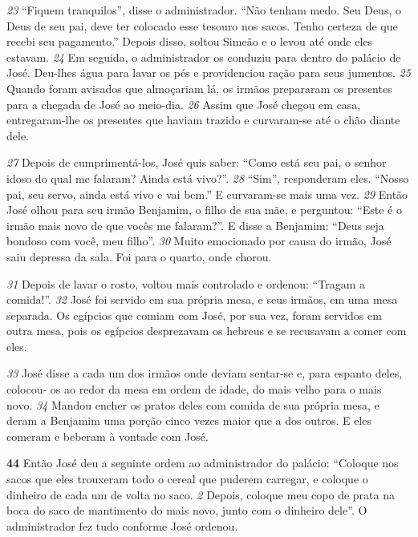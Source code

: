 \bigskip
\textit{\tiny 23}
“Fiquem tranquilos”, disse o administrador. “Não tenham medo. Seu Deus, o
Deus de seu pai, deve ter colocado esse tesouro nos sacos. Tenho certeza de que
recebi seu pagamento.” Depois disso, soltou Simeão e o levou até onde eles
estavam.
\textit{\tiny 24}
Em seguida, o administrador os conduziu para dentro do palácio de José.
Deu-lhes água para lavar os pés e providenciou ração para seus jumentos.
\textit{\tiny 25}
Quando foram avisados que almoçariam lá, os irmãos prepararam os presentes
para a chegada de José ao meio-dia.
\textit{\tiny 26}
Assim que José chegou em casa, entregaram-lhe os presentes que haviam
trazido e curvaram-se até o chão diante dele. 

\bigskip
\textit{\tiny 27}
Depois de cumprimentá-los, José
quis saber: “Como está seu pai, o senhor idoso do qual me falaram? Ainda está
vivo?”.
\textit{\tiny 28}
“Sim”, responderam eles. “Nosso pai, seu servo, ainda está vivo e vai bem.” E
curvaram-se mais uma vez.
\textit{\tiny 29}
Então José olhou para seu irmão Benjamim, o filho de sua mãe, e perguntou:
“Este é o irmão mais novo de que vocês me falaram?”. E disse a Benjamim: “Deus
seja bondoso com você, meu filho”. 
\textit{\tiny 30}
Muito emocionado por causa do irmão, José
saiu depressa da sala. Foi para o quarto, onde chorou. 

\bigskip
\textit{\tiny 31}
Depois de lavar o rosto,
voltou mais controlado e ordenou: “Tragam a comida!”.
\textit{\tiny 32}
José foi servido em sua própria mesa, e seus irmãos, em uma mesa separada.
Os egípcios que comiam com José, por sua vez, foram servidos em outra mesa,
pois os egípcios desprezavam os hebreus e se recusavam a comer com eles. 

\bigskip
\textit{\tiny 33}
José
disse a cada um dos irmãos onde deviam sentar-se e, para espanto deles, colocou-
os ao redor da mesa em ordem de idade, do mais velho para o mais novo.
\textit{\tiny 34}
Mandou encher os pratos deles com comida de sua própria mesa, e deram a
Benjamim uma porção cinco vezes maior que a dos outros. E eles comeram e
beberam à vontade com José.

\bigskip   
\textbf{\large 44}
 Então José deu a seguinte ordem ao administrador do palácio: “Coloque
nos sacos que eles trouxeram todo o cereal que puderem carregar, e coloque o
dinheiro de cada um de volta no saco. 
\textit{\tiny 2} 
Depois, coloque meu copo de prata na
boca do saco de mantimento do mais novo, junto com o dinheiro dele”. O
administrador fez tudo conforme José ordenou. 

